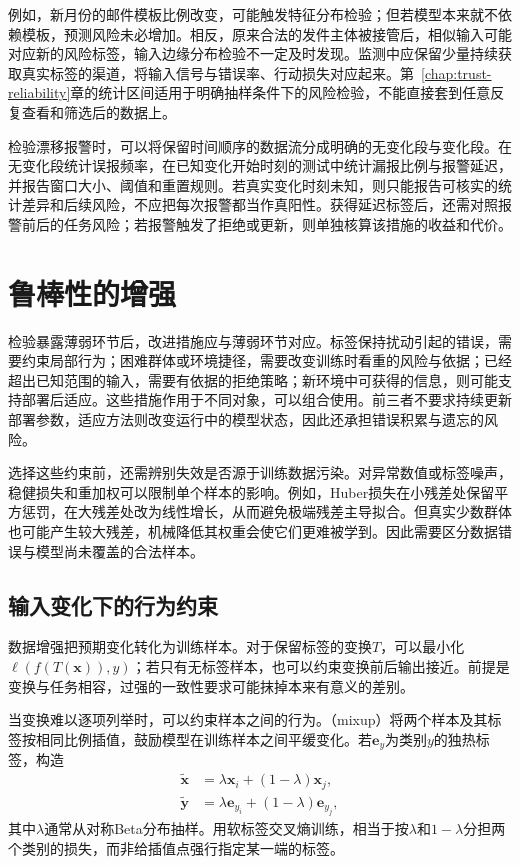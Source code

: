 例如，新月份的邮件模板比例改变，可能触发特征分布检验；但若模型本来就不依赖模板，预测风险未必增加。相反，原来合法的发件主体被接管后，相似输入可能对应新的风险标签，输入边缘分布检验不一定及时发现。监测中应保留少量持续获取真实标签的渠道，将输入信号与错误率、行动损失对应起来。第~\ref{chap:trust-reliability}章的统计区间适用于明确抽样条件下的风险检验，不能直接套到任意反复查看和筛选后的数据上。

检验漂移报警时，可以将保留时间顺序的数据流分成明确的无变化段与变化段。在无变化段统计误报频率，在已知变化开始时刻的测试中统计漏报比例与报警延迟，并报告窗口大小、阈值和重置规则。若真实变化时刻未知，则只能报告可核实的统计差异和后续风险，不应把每次报警都当作真阳性。获得延迟标签后，还需对照报警前后的任务风险；若报警触发了拒绝或更新，则单独核算该措施的收益和代价。

\section{鲁棒性的增强}
\label{sec:robustness-enhancement}

检验暴露薄弱环节后，改进措施应与薄弱环节对应。标签保持扰动引起的错误，需要约束局部行为；困难群体或环境捷径，需要改变训练时看重的风险与依据；已经超出已知范围的输入，需要有依据的拒绝策略；新环境中可获得的信息，则可能支持部署后适应。这些措施作用于不同对象，可以组合使用。前三者不要求持续更新部署参数，适应方法则改变运行中的模型状态，因此还承担错误积累与遗忘的风险。

选择这些约束前，还需辨别失效是否源于训练数据污染。对异常数值或标签噪声，稳健损失和重加权可以限制单个样本的影响。例如，Huber损失在小残差处保留平方惩罚，在大残差处改为线性增长，从而避免极端残差主导拟合。但真实少数群体也可能产生较大残差，机械降低其权重会使它们更难被学到。因此需要区分数据错误与模型尚未覆盖的合法样本。

\subsection{输入变化下的行为约束}
\label{sec:robustness-local-enhancement}

数据增强把预期变化转化为训练样本。对于保留标签的变换$T$，可以最小化$\ell(f(T(\bm{x})),y)$；若只有无标签样本，也可以约束变换前后输出接近。前提是变换与任务相容，过强的一致性要求可能抹掉本来有意义的差别。

当变换难以逐项列举时，可以约束样本之间的行为。（mixup）将两个样本及其标签按相同比例插值，鼓励模型在训练样本之间平缓变化。若$\bm{e}_{y}$为类别$y$的独热标签，构造
\begin{equation}
 \begin{aligned}
  \widetilde{\bm{x}}&=\lambda\bm{x}_i+(1-\lambda)\bm{x}_j,\\
  \widetilde{\bm{y}}&=\lambda\bm{e}_{y_i}
                         +(1-\lambda)\bm{e}_{y_j},
 \end{aligned}
 \label{eq:robustness-mixup}
\end{equation}
其中$\lambda$通常从对称Beta分布抽样。用软标签交叉熵训练，相当于按$\lambda$和$1-\lambda$分担两个类别的损失，而非给插值点强行指定某一端的标签。

